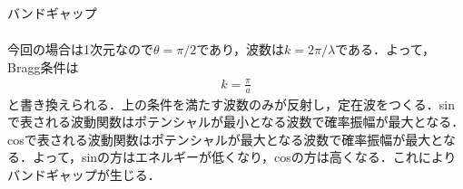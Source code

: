 \documentclass{report}
\begin{document}
\begin{myex}{バンドギャップ}{}
\begin{enumerate}
\begin{align}
    \end{align}
    今回の場合は1次元なので$\theta = \pi/2$であり，波数は$k = 2\pi/\lambda$である．よって，Bragg条件は
    \begin{align}
      k = \frac{\pi}{a}
    \end{align}
    と書き換えられる．上の条件を満たす波数のみが反射し，定在波をつくる．sinで表される波動関数はポテンシャルが最小となる波数で確率振幅が最大となる．
    cosで表される波動関数はポテンシャルが最大となる波数で確率振幅が最大となる．よって，sinの方はエネルギーが低くなり，cosの方は高くなる．これによりバンドギャップが生じる．
  \end{enumerate}
  \end{myex}
\end{document}
